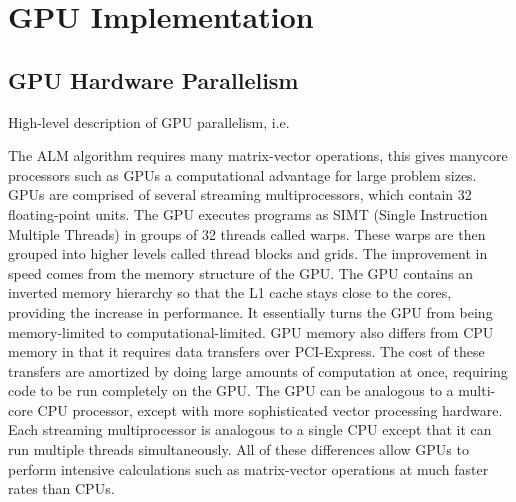 \documentclass[10pt,twocolumn,letterpaper]{article}
\begin{document}


\section{GPU Implementation}
\subsection{GPU Hardware Parallelism}
High-level description of GPU parallelism, i.e.

The ALM algorithm requires many matrix-vector operations, this gives manycore processors such as GPUs a computational advantage for large problem sizes.  
GPUs are comprised of several streaming multiprocessors, which contain 32 floating-point units.  The GPU executes programs as SIMT (Single Instruction Multiple Threads) in groups of 32 threads called warps.  These warps are then grouped into higher levels called thread blocks and grids.  The improvement in speed comes from the memory structure of the GPU.   The GPU contains an inverted memory hierarchy so that the L1 cache stays close to the cores, providing the increase in performance.  It essentially turns the GPU from being memory-limited to computational-limited.
GPU memory also differs from CPU memory in that it requires data transfers over PCI-Express.  The cost of these transfers are amortized by doing large amounts of computation at once, requiring code to be run completely on the GPU.  The GPU can be analogous to a multi-core CPU processor, except with more sophisticated vector processing hardware.  Each streaming multiprocessor is analogous to a single CPU except that it can run multiple threads simultaneously.
All of these differences allow GPUs to perform intensive calculations such as matrix-vector operations at much faster rates than CPUs.
\end{document}
